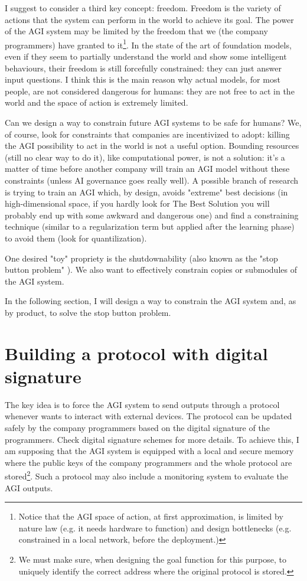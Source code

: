 \documentclass{article}
\begin{document}
I suggest to consider a third key concept: freedom. 
Freedom is the variety of actions that the system can perform in the world to achieve its goal.
The power of the AGI system may be limited by the freedom that we (the company programmers) have granted 
to it\footnote{Notice that the AGI space of action, at first approximation, is limited by nature law (e.g. it needs hardware to function) 
and design bottlenecks (e.g. constrained in a local network, before the deployment.)}.
In the state of the art of foundation models, even if they seem to partially understand the world and show some intelligent behaviours, 
their freedom is still forcefully constrained: they can just answer input questions.
I think this is the main reason why actual models, for most people, are not considered dangerous for humans: 
they are not free to act in the world and the space of action is extremely limited.

Can we design a way to constrain future AGI systems to be safe for humans? 
We, of course, look for constraints that companies are incentivized to adopt: killing 
the AGI possibility to act in the world is not a useful option.
Bounding resources (still no clear way to do it), like computational power, is not a 
solution: it's a matter of time before another company will train an AGI model without these constraints (unless AI governance goes really well).
A possible branch of research is trying to train an AGI which, by design, avoids "extreme" best decisions (in high-dimensional space, if you hardly look for The Best Solution you will probably end up with some awkward and dangerous one) 
and find a constraining technique (similar to a regularization term but applied after the learning phase) to avoid them (look for quantilization).

One desired "toy" propriety is the shutdownability (also known as the "stop button problem" \cite{corrigibility}).
We also want to effectively constrain copies or submodules of the AGI system.

In the following section, I will design a way to constrain the AGI system and, as by product, to solve the stop button problem.

\section{Building a protocol with digital signature}
The key idea is to force the AGI system to send outputs through a protocol whenever wants to interact with external devices.
The protocol can be updated safely by the company programmers based on the digital signature of the programmers. Check digital signature schemes \cite{digital_signature} for more details.
To achieve this, I am supposing that the AGI system is equipped with a local and secure memory where the public keys of the company programmers and the whole protocol are stored\footnote{
We must make sure, when designing the goal function for this purpose, to uniquely identify the correct address where the original protocol is stored.}.
Such a protocol may also include a monitoring system to evaluate the AGI outputs.
\end{document}
